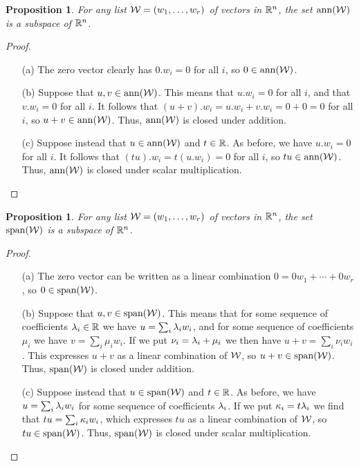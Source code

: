 \documentclass[reqno]{amsart}
\newtheorem{proposition}[theorem]{Proposition}
\theoremstyle{definition}
\begin{document}
\begin{proposition}\label{prop-ann-subspace}
 For any list $\mathcal{W}=(w_1,\dotsc,w_r)$ of vectors in ${\mathbb{R}}^n$, the set
 $\operatorname{ann}(\mathcal{W})$ is a subspace of ${\mathbb{R}}^n$.
\end{proposition}
\begin{proof}
 \begin{itemize}
  \item[(a)] The zero vector clearly has $0.w_i=0$ for all $i$, so
   $0\in\operatorname{ann}(\mathcal{W})$.
  \item[(b)] Suppose that $u,v\in\operatorname{ann}(\mathcal{W})$.  This means that
   $u.w_i=0$ for all $i$, and that $v.w_i=0$ for all $i$.  It follows
   that $(u+v).w_i=u.w_i+v.w_i=0+0=0$ for all $i$, so
   $u+v\in\operatorname{ann}(\mathcal{W})$.  Thus, $\operatorname{ann}(\mathcal{W})$ is closed under addition.
  \item[(c)] Suppose instead that $u\in\operatorname{ann}(\mathcal{W})$ and $t\in{\mathbb{R}}$.  As
   before, we have $u.w_i=0$ for all $i$.  It follows that
   $(tu).w_i=t(u.w_i)=0$ for all $i$, so $tu\in\operatorname{ann}(\mathcal{W})$.  Thus,
   $\operatorname{ann}(\mathcal{W})$ is closed under scalar multiplication.
 \end{itemize}
\end{proof}

\begin{proposition}\label{prop-span-subspace}
 For any list $\mathcal{W}=(w_1,\dotsc,w_r)$ of vectors in ${\mathbb{R}}^n$, the set
 $\operatorname{span}(\mathcal{W})$ is a subspace of ${\mathbb{R}}^n$.
\end{proposition}
\begin{proof}
 \begin{itemize}
  \item[(a)] The zero vector can be written as a linear combination
   $0=0w_1+\dotsb+0w_r$, so $0\in\operatorname{span}(\mathcal{W})$.
  \item[(b)] Suppose that $u,v\in\operatorname{span}(\mathcal{W})$.  This means that for some
   sequence of coefficients $\lambda_i\in{\mathbb{R}}$ we have $u=\sum_i\lambda_iw_i$,
   and for some sequence of coefficients $\mu_i$ we have
   $v=\sum_i\mu_iw_i$.  If we put $\nu_i=\lambda_i+\mu_i$ we then have
   $u+v=\sum_i\nu_iw_i$.  This expresses $u+v$ as a linear combination
   of $\mathcal{W}$, so $u+v\in\operatorname{span}(\mathcal{W})$.  Thus, $\operatorname{span}(\mathcal{W})$ is closed under
   addition.
  \item[(c)] Suppose instead that $u\in\operatorname{span}(\mathcal{W})$ and $t\in{\mathbb{R}}$.  As
   before, we have $u=\sum_i\lambda_iw_i$ for some sequence of
   coefficients $\lambda_i$.  If we put $\kappa_i=t\lambda_i$ we find that
   $tu=\sum_i\kappa_iw_i$, which expresses $tu$ as a linear combination of
   $\mathcal{W}$, so $tu\in\operatorname{span}(\mathcal{W})$.  Thus, $\operatorname{span}(\mathcal{W})$ is closed under
   scalar multiplication.
 \end{itemize}
\end{proof}
\end{document}
